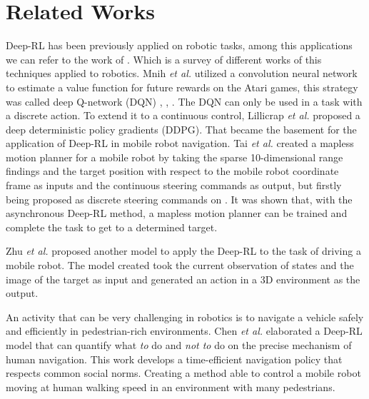 \section{Related Works}

Deep-RL has been previously applied on robotic tasks, among this applications we can refer to the work of \cite{kober2013reinforcement}.
Which is a survey of different works of this techniques applied to robotics.
Mnih \textit{et al.} \cite{mnih2013playing} utilized a convolution neural network to estimate a value function for future rewards on the Atari games, this strategy was called deep Q-network (DQN) \cite{mnih2013playing}, \cite{hausknecht2015deep}, \cite{van2016deep}.
The DQN can only be used in a task with a discrete action.
To extend it to a continuous control, Lillicrap \textit{et al.} \cite{lillicrap2015continuous} proposed a deep deterministic policy gradients (DDPG).
That became the basement for the application of Deep-RL in mobile robot navigation.
Tai \textit{et al.} \cite{tai2017virtual} created a mapless motion planner for a mobile robot by taking the sparse 10-dimensional range findings and the target position with respect to the mobile robot coordinate frame as inputs and the continuous steering commands as output, but firstly being proposed as discrete steering commands on \cite{tai2016towards}. It was shown that, with the asynchronous Deep-RL method, a mapless motion planner can be trained and complete the task to get to a determined target. 

Zhu \textit{et al.} \cite{zhu2017target} proposed another model to apply the Deep-RL to the task of driving a mobile robot.
The model created took the current observation of states and the image of the target as input and generated an action in a 3D environment as the output.

An activity that can be very challenging in robotics is to navigate a vehicle safely and efficiently in pedestrian-rich environments. Chen \textit{et al.} \cite{chen2017socially} elaborated a Deep-RL model that can quantify what \textit{to} do and \textit{not to} do on the precise mechanism of human  navigation.
This work develops a time-efficient navigation policy that respects common social norms.
Creating a method able to control a mobile robot moving at human walking speed in an environment with many pedestrians.